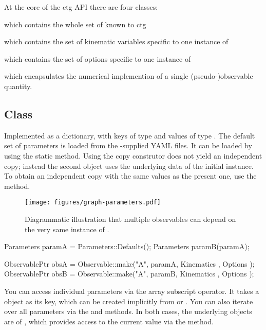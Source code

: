 At the core of the ctg API there are four classes:
\begin{description}[leftmargin=!,labelwidth=.15\textwidth]
    \item[\class{Parameters}]
        which contains the whole set of  known to ctg
    \item[\class{Kinematics}]
        which contains the set of kinematic variables specific to one
        instance of 
    \item[\class{Options}]
        which contains the set of options specific to one instance of
    \item[\class{Observable}]
        which encapsulates the numerical implemention of a single
        (pseudo-)observable quantity.
\end{description}

\subsection{Class }

Implemented as a dictionary, with keys of type  and values of type
. The default set of parameters is loaded from the \ctg-supplied YAML files. It can be
loaded by using the static  method. Using the copy construtor does not yield
an independent copy; instead the second object uses the underlying data of the initial
instance. To obtain an independent copy with the same values as the present one, use
the  method.

\begin{figure}[t]
    \centering
    \texttt{[image: figures/graph-parameters.pdf]}
    \caption{%
        Diagrammatic illustration that multiple observables can depend on the
        very same instance of .
    }
\end{figure}

\begin{sourcecode}
Parameters paramA = Parameters::Defaults();
Parameters paramB(paramA);

ObservablePtr obsA = Observable::make("A", paramA, Kinematics{ }, Options{ });
ObservablePtr obsB = Observable::make("A", paramB, Kinematics{ }, Options{ });
\end{sourcecode}

You can access individual parameters via the array subscript operator. It takes
a  object as its key, which can be created implicitly
from  or . You can also iterate over all
parameters via the  and  methods. In both cases, the
underlying objects are of , which provides access to
the current value via the  method.


